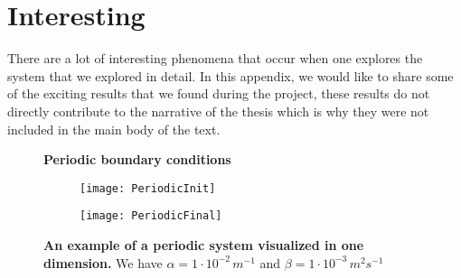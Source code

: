 \chapter{Interesting }

There are a lot of interesting phenomena that occur when one explores the system that we explored in detail. In this appendix, we would like to share some of the exciting results that we found during the project, these results do not directly contribute to the narrative of the thesis which is why they were not included in the main body of the text.

\begin{figure}
	\center
	\textbf{Periodic boundary conditions}
	\vspace{0.5cm}

	\begin{subfigure}{0.49\textwidth}
		\texttt{[image: PeriodicInit]}
	\end{subfigure}
	\begin{subfigure}{0.49\textwidth}
		\texttt{[image: PeriodicFinal]}
	\end{subfigure}
	\caption{\textbf{An example of a periodic system visualized in one dimension.} We have $\alpha = 1 \cdot 10^{-2} \, m^{-1}$ and $\beta = 1 \cdot 10^{-3}  \, m^2 s^{-1}$}
\end{figure}